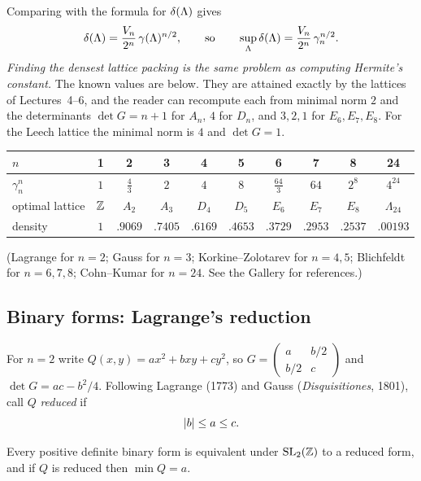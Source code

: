 Comparing with the formula for $\delta(\Lambda)$ gives
\begin{equation}\label{NT:eq:hermite-density}
  \delta(\Lambda)=\frac{V_n}{2^n}\,\gamma(\Lambda)^{n/2},
  \qquad\text{so}\qquad
  \sup_\Lambda\delta(\Lambda)=\frac{V_n}{2^n}\,\gamma_n^{n/2}.
\end{equation}
\emph{Finding the densest lattice packing is the same problem as computing Hermite's constant.} The
known values are below. They are attained exactly by the lattices of Lectures~4--6, and the reader
can recompute each from minimal norm $2$ and the determinants $\det G=n+1$ for $A_n$, $4$ for $D_n$, and
$3,2,1$ for $E_6,E_7,E_8$. For the Leech lattice the minimal norm is $4$ and $\det G=1$.
\begin{center}
\renewcommand{\arraystretch}{1.2}
\begin{tabular}{lccccccccc}
\toprule
$n$ & 1 & 2 & 3 & 4 & 5 & 6 & 7 & 8 & 24\\
\midrule
$\gamma_n^n$ & $1$ & $\tfrac43$ & $2$ & $4$ & $8$ & $\tfrac{64}3$ & $64$ & $2^8$ & $4^{24}$\\
optimal lattice & $\mathbb{Z}$ & $A_2$ & $A_3$ & $D_4$ & $D_5$ & $E_6$ & $E_7$ & $E_8$ & $\Lambda_{24}$\\
density & $1$ & $.9069$ & $.7405$ & $.6169$ & $.4653$ & $.3729$ & $.2953$ & $.2537$ & $.00193$\\
\bottomrule
\end{tabular}
\end{center}
(Lagrange for $n=2$; Gauss for $n=3$; Korkine--Zolotarev for $n=4,5$; Blichfeldt for $n=6,7,8$;
Cohn--Kumar for $n=24$. See the Gallery for references.)

\subsection*{Binary forms: Lagrange's reduction}

For $n=2$ write $Q(x,y)=ax^2+bxy+cy^2$, so $G=\left(\begin{smallmatrix}a&b/2\\b/2&c\end{smallmatrix}\right)$
and $\det G=ac-b^2/4$. Following Lagrange (1773) and Gauss (\emph{Disquisitiones}, 1801), call $Q$
\emph{reduced} if
\[
  \left\lvert b \right\rvert\le a\le c .
\]

\begin{proposition}\label{NT:prop:reduction}
Every positive definite binary form is equivalent under $\mathrm{SL}_2(\mathbb{Z})$ to a reduced form, and if $Q$ is
reduced then $\min Q=a$.
\end{proposition}

